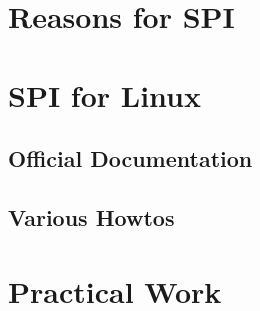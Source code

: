 \section{Reasons for SPI}

\section{SPI for Linux}

\subsection{Official Documentation}

\subsection{Various Howtos}

\section{Practical Work}
